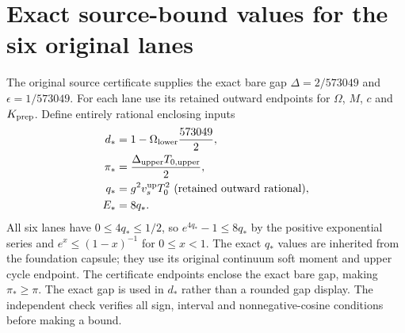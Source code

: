\section{Exact source-bound values for the six original lanes}
\label{sec:chvisd-six-lane-values}

The original source certificate supplies the exact bare gap
$\Delta=2/573049$ and $\epsilon=1/573049$. For each lane use its
retained outward endpoints for $\Omega$, $M$, $c$ and $K_{\rm prep}$.
Define entirely rational enclosing inputs
\begin{equation}
\begin{aligned}
 d_*&=1-\Omega_{\rm lower}\frac{573049}{2},\\
 \pi_*&=\frac{\Delta_{\rm upper}T_{0,\rm upper}}2,\\
 q_*&=g^2v_s^{\rm up}T_0^2\ \text{(retained outward rational)},\\
 E_*&=8q_* .
\end{aligned}
\label{eq:chvisd-rational-inputs}
\end{equation}
All six lanes have $0\leq4q_*\leq1/2$, so
$e^{4q_*}-1\leq8q_*$ by the positive exponential series and
$e^x\leq(1-x)^{-1}$ for $0\leq x<1$.
The exact $q_*$ values are inherited from the foundation capsule;
they use its original continuum soft moment and upper cycle endpoint.
The certificate endpoints enclose the exact bare gap, making
$\pi_*\geq\pi$. The exact gap is used in $d_*$ rather than a rounded
gap display. The independent check verifies all sign, interval and
nonnegative-cosine conditions before making a bound.

\begin{table}[t]\centering
\small\setlength{\tabcolsep}{6pt}

\caption{Outward bounds for each original lane. The ideal-entry column
uses exact preparation and nominal ages. The finite-pulse column uses
the explicit mathematical controls below. The budgeted column adds the
declared timing, preparation and $10^{-3}$ control allowances in
Eq.~\eqref{eq:chvisd-benchmark}. These allowances are receiving inputs.}
\label{tab:chvisd-six-lane-bounds}
\end{table}

